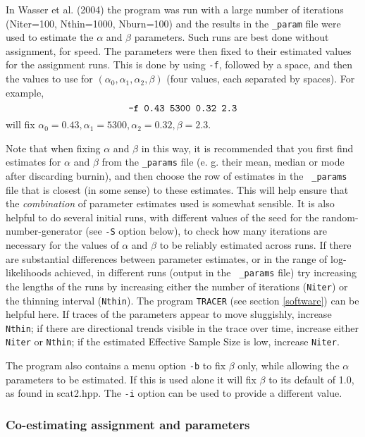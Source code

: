 \documentclass[10pt,titlepage,times,letterpaper]{article}
\begin{document}
In Wasser et al. (2004)
the program was run with a large number of iterations ({Niter=100, Nthin=1000,
Nburn=100}) and the results in the {\tt \_param} file were used to estimate
the $\alpha$ and $\beta$ parameters.  Such runs are best done without assignment,
for speed.  The parameters were then fixed to their estimated values for the
assignment runs.  This is done by using
{\tt -f}, followed by a space, and then the values
to use for $(\alpha_0,\alpha_1,\alpha_2,\beta)$ (four values, each
separated by spaces).  
For example,
$$\text{\tt -f 0.43 5300 0.32 2.3}$$ will fix $\alpha_0 = 0.43, \alpha_1 =
5300, \alpha_2 = 0.32, \beta = 2.3$.

Note that when fixing $\alpha$ and $\beta$ in this way, it
is recommended that you first find estimates for $\alpha$ and $\beta$
from the {\tt \_params} file (e. g. their mean, median or mode after
discarding burnin), and then choose the row of estimates in the {\tt
\_params} file that is closest (in some sense) to these
estimates. This will help ensure that the {\it combination} of
parameter estimates used is somewhat sensible.
It is also helpful to do
several initial runs, with different values of the seed for the
random-number-generator (see {\tt -S} option below), to check how many
iterations are necessary for the values of $\alpha$ and $\beta$ to be
reliably estimated across runs. 
If there are
substantial differences between parameter estimates, or in the range
of log-likelihoods achieved, in different runs (output in the {\tt
\_params} file) try increasing the lengths of the runs by increasing
either the number of iterations ({\tt Niter}) or the thinning interval
({\tt Nthin}).  The program {\tt TRACER} (see section \ref{software}) can be
helpful here.  If traces of the parameters appear to move sluggishly,
increase {\tt Nthin}; if there are directional trends visible in the
trace over time, increase either {\tt Niter} or {\tt Nthin}; if the
estimated Effective Sample Size is low, increase {\tt Niter}.

The program also contains a menu option {\tt -b} to fix $\beta$ only,
while allowing the $\alpha$ parameters to be estimated.  If this is
used alone it will fix $\beta$ to its default of 1.0, as found in
scat2.hpp.  The {\tt -i} option can be used to provide a different
value. 

\subsubsection{Co-estimating assignment and parameters}
\end{document}
